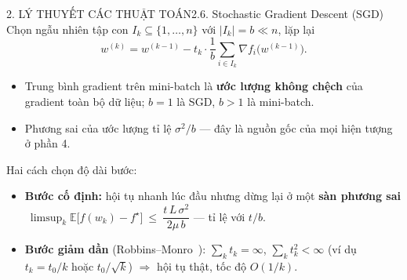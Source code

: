 \documentclass[aspectratio=169,11pt]{beamer}
\newcommand{\E}{\mathbb{E}}
\begin{document}
\begin{frame}{2. LÝ THUYẾT CÁC THUẬT TOÁN}{2.6. Stochastic Gradient Descent (SGD)}
  \small
  Chọn ngẫu nhiên tập con $I_k\subseteq\{1,\dots,n\}$ với $|I_k|=b\ll n$, lặp lại
  \[
    w^{(k)}=w^{(k-1)}-t_k\cdot\frac1b\sum_{i\in I_k}\nabla f_i\big(w^{(k-1)}\big).
  \]
  \begin{itemize}
    \item Trung bình gradient trên mini-batch là \textbf{ước lượng không chệch} của gradient toàn bộ dữ liệu;
          $b=1$ là SGD, $b>1$ là mini-batch.
    \item Phương sai của ước lượng tỉ lệ $\sigma^2/b$ — đây là nguồn gốc của mọi hiện tượng ở phần 4.
  \end{itemize}
  \vspace{4pt}
  Hai cách chọn độ dài bước:
  \begin{itemize}
    \item \textbf{Bước cố định:} hội tụ nhanh lúc đầu nhưng dừng lại ở một \textbf{sàn phương sai}
          $\ \limsup_k \E\big[f(w_k)-f^\star\big]\ \le\ \dfrac{t\,L\,\sigma^2}{2\mu\,b}$ — tỉ lệ với $t/b$.
    \item \textbf{Bước giảm dần} (Robbins--Monro~\cite{robbins1951stochastic}): $\sum_k t_k=\infty$,
          $\sum_k t_k^2<\infty$ (ví dụ $t_k=t_0/k$ hoặc $t_0/\sqrt k$) $\Rightarrow$ hội tụ thật, tốc độ $O(1/k)$.
  \end{itemize}
\end{frame}
\end{document}

